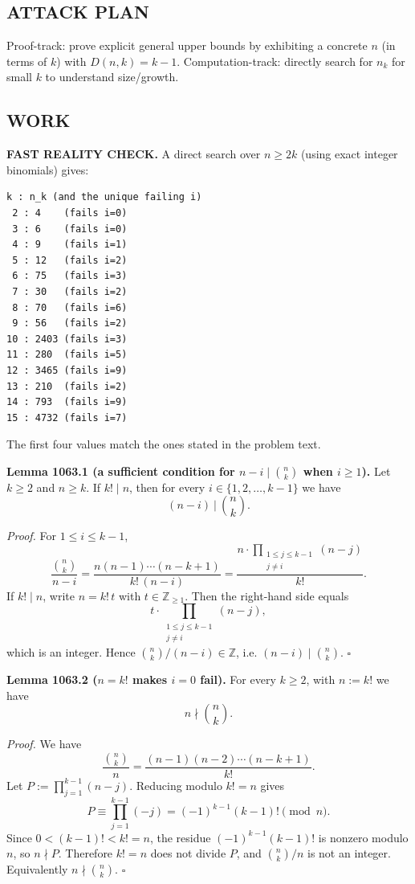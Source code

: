\subsection*{ATTACK PLAN}
Proof-track: prove explicit general upper bounds by exhibiting a concrete $n$ (in terms of $k$) with $D(n,k)=k-1$.
Computation-track: directly search for $n_k$ for small $k$ to understand size/growth.

\subsection*{WORK}
\textbf{FAST REALITY CHECK.}
A direct search over $n\ge 2k$ (using exact integer binomials) gives:
\begin{verbatim}
k : n_k (and the unique failing i)
 2 : 4    (fails i=0)
 3 : 6    (fails i=0)
 4 : 9    (fails i=1)
 5 : 12   (fails i=2)
 6 : 75   (fails i=3)
 7 : 30   (fails i=2)
 8 : 70   (fails i=6)
 9 : 56   (fails i=2)
10 : 2403 (fails i=3)
11 : 280  (fails i=5)
12 : 3465 (fails i=9)
13 : 210  (fails i=2)
14 : 793  (fails i=9)
15 : 4732 (fails i=7)
\end{verbatim}
The first four values match the ones stated in the problem text.

\medskip
\textbf{Lemma 1063.1 (a sufficient condition for $n-i\mid \binom{n}{k}$ when $i\ge 1$).}
Let $k\ge 2$ and $n\ge k$. If $k!\mid n$, then for every $i\in\{1,2,\dots,k-1\}$ we have
\[
(n-i)\ \Big|\ \binom{n}{k}.
\]

\emph{Proof.}
For $1\le i\le k-1$,
\[
\frac{\binom{n}{k}}{n-i} = \frac{n(n-1)\cdots(n-k+1)}{k!\,(n-i)} = \frac{n\cdot\prod_{\substack{1\le j\le k-1\\ j\ne i}} (n-j)}{k!}.
\]
If $k!\mid n$, write $n=k!\,t$ with $t\in\mathbb Z_{\ge 1}$. Then the right-hand side equals
\[
 t\cdot\prod_{\substack{1\le j\le k-1\\ j\ne i}} (n-j),
\]
which is an integer. Hence $\binom{n}{k}/(n-i)\in\mathbb Z$, i.e. $(n-i)\mid \binom{n}{k}$. \hfill$\square$

\medskip
\textbf{Lemma 1063.2 ($n=k!$ makes $i=0$ fail).}
For every $k\ge 2$, with $n:=k!$ we have
\[
 n\nmid \binom{n}{k}.
\]

\emph{Proof.}
We have
\[
\frac{\binom{n}{k}}{n} = \frac{(n-1)(n-2)\cdots (n-k+1)}{k!}.
\]
Let $P:=\prod_{j=1}^{k-1} (n-j)$. Reducing modulo $k!=n$ gives
\[
P \equiv \prod_{j=1}^{k-1} (-j) = (-1)^{k-1}(k-1)! \pmod{n}.
\]
Since $0<(k-1)!<k!=n$, the residue $(-1)^{k-1}(k-1)!$ is nonzero modulo $n$, so $n\nmid P$.
Therefore $k!=n$ does not divide $P$, and $\binom{n}{k}/n$ is not an integer. Equivalently $n\nmid \binom{n}{k}$. \hfill$\square$

